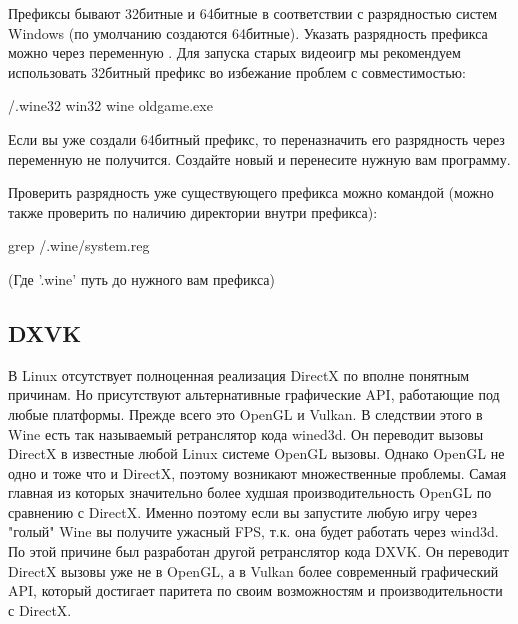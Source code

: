 \documentclass[letterpaper,10pt,russian,openany]{sphinxmanual}
\begin{document}
\sphinxAtStartPar
Префиксы бывают 32\sphinxhyphen{}битные и 64\sphinxhyphen{}битные в соответствии с разрядностью систем Windows (по умолчанию создаются 64\sphinxhyphen{}битные).
Указать разрядность префикса можно через переменную .
Для запуска старых видеоигр мы рекомендуем использовать 32\sphinxhyphen{}битный префикс во избежание проблем с совместимостью:

\begin{sphinxVerbatim}[commandchars=\\\{\}]
\PYGZti{}/.wine32 win32 wine oldgame.exe
\end{sphinxVerbatim}

\sphinxAtStartPar
Если вы уже создали 64\sphinxhyphen{}битный префикс, то переназначить его разрядность через переменную  не получится. Создайте новый и перенесите нужную вам программу.

\sphinxAtStartPar
Проверить разрядность уже существующего префикса можно командой (можно также проверить по наличию директории  внутри префикса):

\begin{sphinxVerbatim}[commandchars=\\\{\}]
grep  \PYGZti{}/.wine/system.reg
\end{sphinxVerbatim}

\sphinxAtStartPar
(Где '.wine' \sphinxhyphen{} путь до нужного вам префикса)

\ignorespaces 

\subsection{DXVK}
\label{\detokenize{source/linux-gaming:dxvk}}\label{\detokenize{source/linux-gaming:index-10}}\label{\detokenize{source/linux-gaming:id9}}
\sphinxAtStartPar
В Linux отсутствует полноценная реализация DirectX по вполне понятным причинам. Но присутствуют альтернативные графические API, работающие под любые платформы.
Прежде всего это OpenGL и Vulkan. В следствии этого в Wine есть так называемый ретранслятор кода \sphinxhyphen{} wined3d.
Он переводит вызовы DirectX в известные любой Linux системе OpenGL вызовы. Однако OpenGL не одно и тоже что и DirectX,
поэтому возникают множественные проблемы. Самая главная из которых \sphinxhyphen{} значительно более худшая производительность OpenGL
по сравнению с DirectX. Именно поэтому если вы запустите любую игру через "голый" Wine вы получите ужасный FPS, т.к. она будет работать через wind3d.
По этой причине был разработан другой ретранслятор кода \sphinxhyphen{} DXVK. Он переводит DirectX вызовы уже не в
OpenGL, а в Vulkan \sphinxhyphen{} более современный графический API, который достигает паритета по своим возможностям и производительности с DirectX.
\end{document}

